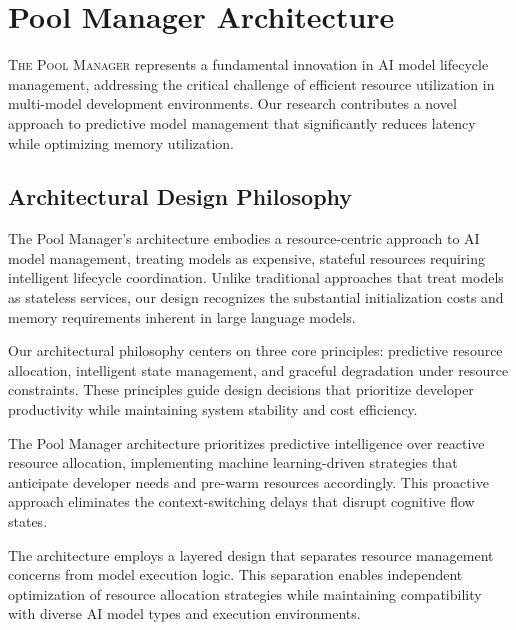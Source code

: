 
\section*{Pool Manager Architecture}

\lettrine{T}{he Pool Manager} represents a fundamental innovation in AI model lifecycle management, addressing the critical challenge of efficient resource utilization in multi-model development environments. Our research contributes a novel approach to predictive model management that significantly reduces latency while optimizing memory utilization.

\subsection*{Architectural Design Philosophy}

The Pool Manager's architecture embodies a resource-centric approach to AI model management, treating models as expensive, stateful resources requiring intelligent lifecycle coordination. Unlike traditional approaches that treat models as stateless services, our design recognizes the substantial initialization costs and memory requirements inherent in large language models.

Our architectural philosophy centers on three core principles: predictive resource allocation, intelligent state management, and graceful degradation under resource constraints. These principles guide design decisions that prioritize developer productivity while maintaining system stability and cost efficiency.

\begin{infobox}[title=Design Principles]
The Pool Manager architecture prioritizes predictive intelligence over reactive resource allocation, implementing machine learning-driven strategies that anticipate developer needs and pre-warm resources accordingly. This proactive approach eliminates the context-switching delays that disrupt cognitive flow states.
\end{infobox}

The architecture employs a layered design that separates resource management concerns from model execution logic. This separation enables independent optimization of resource allocation strategies while maintaining compatibility with diverse AI model types and execution environments.

